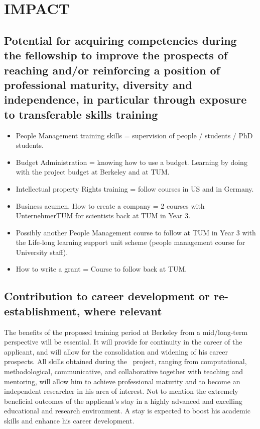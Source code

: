 \section{IMPACT} %
\label{sec:impact}
\subsection{Potential for acquiring competencies during the fellowship to improve the prospects of 
reaching and/or reinforcing a position of professional maturity, diversity and independence, 
in particular through exposure to transferable skills training}
\begin{itemize}
\item People Management training skills = supervision of people / students / PhD students. 
\item Budget Administration = knowing how to use a budget. Learning by doing with the project budget at Berkeley and at TUM.
\item Intellectual property Rights training = follow courses in US and in Germany.
\item Business acumen. How to create a company = 2 courses with UnternehmerTUM for scientists back at TUM in Year 3.
\item Possibly another People Management course to follow at TUM in Year 3 with the Life-long learning support unit scheme (people management course for University staff).
\item How to write a grant = Course to follow back at TUM.
\end{itemize}
\subsection{Contribution to career development or re-establishment, where relevant}
The benefits of the proposed training period at Berkeley from a mid/long-term perspective will 
be essential. It will provide for continuity in the career of the applicant, and will allow for the consolidation and 
widening of his career prospects. All skills obtained during the \ksem\ project, ranging 
from computational, methodological, communicative, and collaborative together with 
teaching and mentoring, will allow him to achieve professional maturity and to become an 
independent researcher in his area of interest. Not to mention the extremely beneficial 
outcomes of the applicant's stay in a highly advanced and excelling educational  and 
research environment. A stay is expected to boost his academic skills and enhance his career development.

